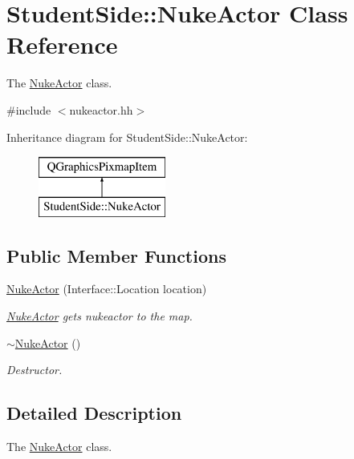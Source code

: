 \hypertarget{class_student_side_1_1_nuke_actor}{\section{Student\-Side\-:\-:Nuke\-Actor Class Reference}
\label{class_student_side_1_1_nuke_actor}
}


The \hyperlink{class_student_side_1_1_nuke_actor}{Nuke\-Actor} class.  




{\ttfamily \#include $<$nukeactor.\-hh$>$}

Inheritance diagram for Student\-Side\-:\-:Nuke\-Actor\-:\begin{figure}[H]
\begin{center}
\leavevmode
\includegraphics[height=2.000000cm]{class_student_side_1_1_nuke_actor}
\end{center}
\end{figure}
\subsection*{Public Member Functions}
\begin{DoxyCompactItemize}
\item 
\hyperlink{class_student_side_1_1_nuke_actor_abc65d6502333d97c4cd1beb37bdaa163}{Nuke\-Actor} (Interface\-::\-Location location)
\begin{DoxyCompactList}\small\item\em \hyperlink{class_student_side_1_1_nuke_actor}{Nuke\-Actor} gets nukeactor to the map. \end{DoxyCompactList}\item 
\hyperlink{class_student_side_1_1_nuke_actor_a1198514f0e17e36e243b344331c543ac}{$\sim$\-Nuke\-Actor} ()
\begin{DoxyCompactList}\small\item\em Destructor. \end{DoxyCompactList}\end{DoxyCompactItemize}


\subsection{Detailed Description}
The \hyperlink{class_student_side_1_1_nuke_actor}{Nuke\-Actor} class. 

